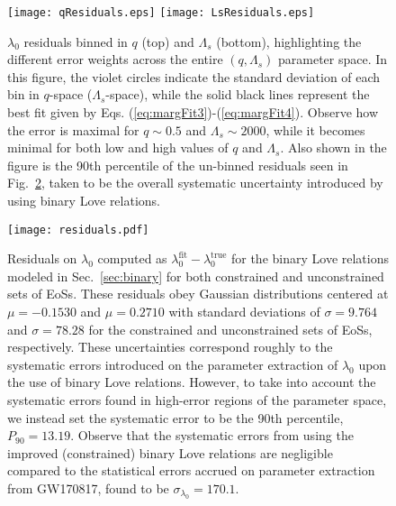 \documentclass[prd,twocolumn,nofootinbib,superscriptaddress,amsmath,amssymb]{revtex4-1}
\begin{document}
\begin{figure}
\begin{center} 
\texttt{[image: qResiduals.eps]}
\texttt{[image: LsResiduals.eps]}
\end{center}
\caption{$\lambda_0$ residuals binned in $q$ (top) and $\Lambda_s$ (bottom), highlighting the different error weights across the entire $(q,\Lambda_s)$ parameter space.
In this figure, the violet circles indicate the standard deviation of each bin in $q$-space ($\Lambda_s$-space), while the solid black lines represent the best fit given by Eqs. (\ref{eq:margFit3})-(\ref{eq:margFit4}).
Observe how the error is maximal for $q\sim0.5$ and $\Lambda_s\sim2000$, while it becomes minimal for both low and high values of $q$ and $\Lambda_s$.
Also shown in the figure is the 90th percentile of the un-binned residuals seen in Fig.~\ref{fig:residuals}, taken to be the overall systematic uncertainty introduced by using binary Love relations.
}
\label{fig:qLsResiduals}
\end{figure}

\begin{figure}
\begin{center} 
\texttt{[image: residuals.pdf]}
\end{center}
\caption{
Residuals on $\lambda_0$ computed as $\lambda_0^{\text{fit}}-\lambda_0^{\text{true}}$ for the binary Love relations modeled in Sec.~\ref{sec:binary} for both constrained and unconstrained sets of EoSs.
These residuals obey Gaussian distributions centered at $\mu=-0.1530$ and $\mu=0.2710$ with standard deviations of $\sigma=9.764$ and $\sigma=78.28$ for the constrained and unconstrained sets of EoSs, respectively.
These uncertainties correspond roughly to the systematic errors introduced on the parameter extraction of $\lambda_0$ upon the use of binary Love relations.
However, to take into account the systematic errors found in high-error regions of the parameter space, we instead set the systematic error to be the 90th percentile, $P_{90}=13.19$.
Observe that the systematic errors from using the improved (constrained) binary Love relations are negligible compared to the statistical errors accrued on parameter extraction from GW170817, found to be $\sigma_{\lambda_0}=170.1$.
}
\label{fig:residuals}
\end{figure}
\end{document}
